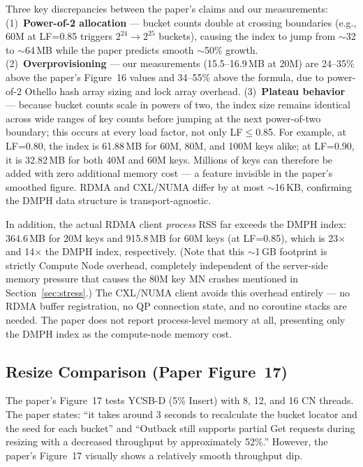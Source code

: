 \documentclass[conference]{IEEEtran}
\begin{document}
Three key discrepancies between the paper's claims and our measurements: (1)~\textbf{Power-of-2 allocation} --- bucket counts double at crossing boundaries (e.g., 60M at LF=0.85 triggers $2^{24}\!\to\!2^{25}$ buckets), causing the index to jump from $\sim$32 to $\sim$64\,MB while the paper predicts smooth $\sim$50\% growth. (2)~\textbf{Overprovisioning} --- our measurements (15.5--16.9\,MB at 20M) are 24--35\% above the paper's Figure~16 values and 34--55\% above the formula, due to power-of-2 Othello hash array sizing and lock array overhead. (3)~\textbf{Plateau behavior} --- because bucket counts scale in powers of two, the index size remains identical across wide ranges of key counts before jumping at the next power-of-two boundary; this occurs at every load factor, not only LF$\leq$0.85. For example, at LF=0.80, the index is 61.88\,MB for 60M, 80M, and 100M keys alike; at LF=0.90, it is 32.82\,MB for both 40M and 60M keys. Millions of keys can therefore be added with zero additional memory cost --- a feature invisible in the paper's smoothed figure. RDMA and CXL/NUMA differ by at most $\sim$16\,KB, confirming the DMPH data structure is transport-agnostic.

In addition, the actual RDMA client \emph{process} RSS far exceeds the DMPH index: 364.6\,MB for 20M keys and 915.8\,MB for 60M keys (at LF=0.85), which is 23$\times$ and 14$\times$ the DMPH index, respectively. (Note that this $\sim$1\,GB footprint is strictly Compute Node overhead, completely independent of the server-side memory pressure that causes the 80M key MN crashes mentioned in Section~\ref{sec:stress}.) The CXL/NUMA client avoids this overhead entirely --- no RDMA buffer registration, no QP connection state, and no coroutine stacks are needed. The paper does not report process-level memory at all, presenting only the DMPH index as the compute-node memory cost.

\subsection{Resize Comparison (Paper Figure~17)}

The paper's Figure~17 tests YCSB-D (5\% Insert) with 8, 12, and 16 CN threads. The paper states: ``it takes around 3 seconds to recalculate the bucket locator and the seed for each bucket'' and ``Outback still supports partial Get requests during resizing with a decreased throughput by approximately 52\%.'' However, the paper's Figure~17 visually shows a relatively smooth throughput dip.
\end{document}

